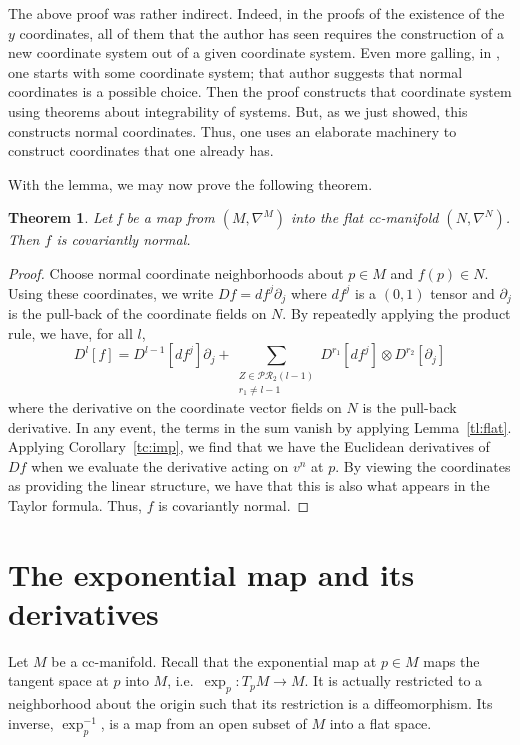 \documentclass[11pt]{article}
\newtheorem{theorem}{Theorem}
\theoremstyle{remark}
\begin{document}
The above proof was rather indirect. Indeed, in the proofs of the
existence of the $y$ coordinates, all of them that the author  has seen 
requires the construction
of a new coordinate system out of a given coordinate
system. Even more galling,  in \cite{Lee98}, one starts with some
coordinate system; that author suggests that normal coordinates is a
possible choice. Then the proof constructs that coordinate system
using theorems about integrability of systems. But, as we just showed,
this constructs normal coordinates. Thus, one uses an elaborate
machinery to construct coordinates that one already has. 

With the lemma, we may now prove the following theorem.
\begin{theorem} \label{t:sim}  
Let f be a map from $(M, \nabla^M)$ into the flat cc-manifold
$(N, \nabla^N)$. 
Then $f$ is covariantly normal. 
\end{theorem}

\begin{proof}
Choose normal coordinate neighborhoods
about $p \in M$ and $f(p) \in N$. 
Using these coordinates, we write 
$Df = df^j \partial_j$ where $df^j$ is a $(0,1)$ tensor and
$\partial_j$ is the pull-back of the coordinate fields on $N$.  
By repeatedly applying the product rule, we have, for all $l$, 
\[\ensuremath{D^{l} [{f}] {} } = \ensuremath{D^{l-1} [{df^j}] {} }\partial_j + 
\sum_{\substack{Z \in \ensuremath{\mathcal{PR}}_{2}(l-1)\\ r_1 \neq l-1}} 
\ensuremath{D^{r_1} [{df^j}] {} } \otimes 
\ensuremath{D^{r_2} [{\partial_j}] {} }
\]
where the derivative on the coordinate vector fields on $N$ is the
pull-back derivative. In any event, the terms in the sum vanish
by applying Lemma~\ref{tl:flat}.
Applying Corollary~\ref{tc:imp}, we find that we have the Euclidean
derivatives of $Df$ when we evaluate the derivative acting on $v^n$ at
$p$. By viewing the coordinates as providing the linear structure, we
have that this is also what appears in the Taylor formula. Thus, $f$
is covariantly normal.
\end{proof}


\section{The exponential map and its derivatives}
\label{s:exp} 

Let $M$ be a cc-manifold. 
Recall that the exponential map at $p \in M$ maps the
tangent space at $p$ into $M$, i.e.\ $\ensuremath{\exp_{p}{}}:\ensuremath{T_p M} \to M$. It
is actually restricted to a neighborhood about the origin such that
its restriction is
a diffeomorphism. Its inverse, \ensuremath{\exp^{-1}_{p}{}}, is a map from an open subset of
$M$ into a flat space.
\end{document}
